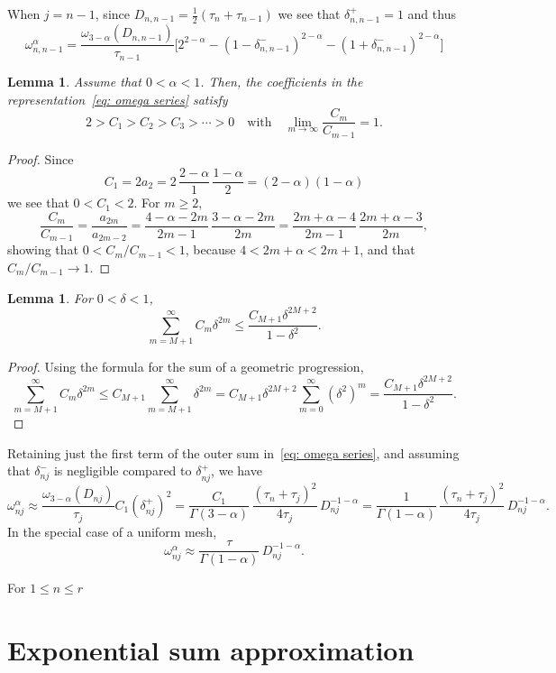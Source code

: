 \documentclass[a4paper,12pt]{article}
\newtheorem{lemma}[theorem]{Lemma}
\begin{document}
When $j=n-1$, since $D_{n,n-1}=\tfrac12(\tau_n+\tau_{n-1})$ we see that
$\delta_{n,n-1}^+=1$ and thus
\[
\omega^\alpha_{n,n-1}=\frac{\omega_{3-\alpha}(D_{n,n-1})}{\tau_{n-1}}
\bigl[
    2^{2-\alpha}-(1-\delta_{n,n-1}^-)^{2-\alpha}
    -(1+\delta_{n,n-1}^-)^{2-\alpha}\bigr]
\]

\begin{lemma}
Assume that $0<\alpha<1$. Then, the coefficients in the
representation~\eqref{eq: omega series} satisfy
\[
2>C_1>C_2>C_3>\cdots>0\quad\text{with}\quad
\lim_{m\to\infty}\frac{C_m}{C_{m-1}}=1.
\]
\end{lemma}
\begin{proof}
Since
\[
C_1=2a_2=2\,\frac{2-\alpha}{1}\,\frac{1-\alpha}{2}=(2-\alpha)(1-\alpha)
\]
we see that $0<C_1<2$.  For $m\ge2$,
\[
\frac{C_m}{C_{m-1}}=\frac{a_{2m}}{a_{2m-2}}
    =\frac{4-\alpha-2m}{2m-1}\,\frac{3-\alpha-2m}{2m}
    =\frac{2m+\alpha-4}{2m-1}\,\frac{2m+\alpha-3}{2m},
\]
showing that $0<C_m/C_{m-1}<1$, because $4<2m+\alpha<2m+1$, and that
$C_m/C_{m-1}\to1$.
\end{proof}

\begin{lemma}
For $0<\delta<1$,
\[
\sum_{m=M+1}^\infty C_m\delta^{2m}\le \frac{C_{M+1}\delta^{2M+2}}{1-\delta^2}.
\]
\end{lemma}
\begin{proof}
Using the formula for the sum of a geometric progression,
\[
\sum_{m=M+1}^\infty C_m\delta^{2m}\le C_{M+1}\sum_{m=M+1}^\infty\delta^{2m}
    =C_{M+1}\delta^{2M+2}\sum_{m=0}^\infty(\delta^2)^m
    =\frac{C_{M+1}\delta^{2M+2}}{1-\delta^2}.
\]
\end{proof}

Retaining just the first term of the outer sum in~\eqref{eq: omega series}, and
assuming that $\delta^-_{nj}$ is negligible compared to $\delta^+_{nj}$, we have
\[
\omega^\alpha_{nj}\approx
\frac{\omega_{3-\alpha}(D_{nj})}{\tau_j}C_1(\delta^+_{nj})^2
    =\frac{C_1}{\Gamma(3-\alpha)}\,
    \frac{(\tau_n+\tau_j)^2}{4\tau_j}\,D_{nj}^{-1-\alpha}
    =\frac{1}{\Gamma(1-\alpha)}\,
    \frac{(\tau_n+\tau_j)^2}{4\tau_j}\,D_{nj}^{-1-\alpha}.
\]
In the special case of a uniform mesh,
\[
\omega^\alpha_{nj}\approx\frac{\tau}{\Gamma(1-\alpha)}\,D_{nj}^{-1-\alpha}.
\]

For $1\le n\le r$
\section{Exponential sum approximation}
\end{document}
